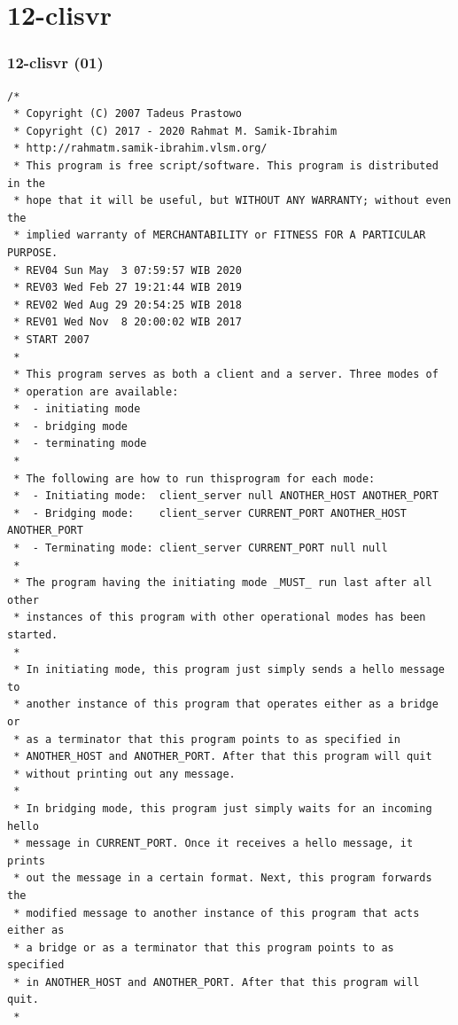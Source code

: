 \documentclass[aspectratio=169, xcolor=table, notheorems, hyperref={pdfpagelabels=false}]{beamer}
\begin{document}
\section{12-clisvr}
\begin{frame}[fragile]
\frametitle{12-clisvr (01)}
\begin{lstlisting}[basicstyle=\ttfamily\tiny]
/*
 * Copyright (C) 2007 Tadeus Prastowo
 * Copyright (C) 2017 - 2020 Rahmat M. Samik-Ibrahim
 * http://rahmatm.samik-ibrahim.vlsm.org/
 * This program is free script/software. This program is distributed in the 
 * hope that it will be useful, but WITHOUT ANY WARRANTY; without even the 
 * implied warranty of MERCHANTABILITY or FITNESS FOR A PARTICULAR PURPOSE.
 * REV04 Sun May  3 07:59:57 WIB 2020
 * REV03 Wed Feb 27 19:21:44 WIB 2019
 * REV02 Wed Aug 29 20:54:25 WIB 2018
 * REV01 Wed Nov  8 20:00:02 WIB 2017
 * START 2007
 *
 * This program serves as both a client and a server. Three modes of
 * operation are available:
 *  - initiating mode
 *  - bridging mode
 *  - terminating mode
 *
 * The following are how to run thisprogram for each mode:
 *  - Initiating mode:  client_server null ANOTHER_HOST ANOTHER_PORT
 *  - Bridging mode:    client_server CURRENT_PORT ANOTHER_HOST ANOTHER_PORT
 *  - Terminating mode: client_server CURRENT_PORT null null
 *
 * The program having the initiating mode _MUST_ run last after all other
 * instances of this program with other operational modes has been started.
 *
 * In initiating mode, this program just simply sends a hello message to
 * another instance of this program that operates either as a bridge or
 * as a terminator that this program points to as specified in
 * ANOTHER_HOST and ANOTHER_PORT. After that this program will quit
 * without printing out any message.
 *
 * In bridging mode, this program just simply waits for an incoming hello
 * message in CURRENT_PORT. Once it receives a hello message, it prints
 * out the message in a certain format. Next, this program forwards the
 * modified message to another instance of this program that acts either as
 * a bridge or as a terminator that this program points to as specified
 * in ANOTHER_HOST and ANOTHER_PORT. After that this program will quit.
 *

\end{lstlisting}
\end{frame}
\end{document}
